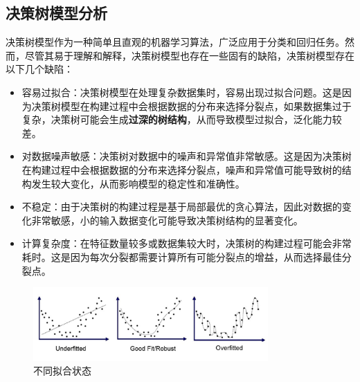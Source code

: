 \subsection{决策树模型分析}
决策树模型作为一种简单且直观的机器学习算法，广泛应用于分类和回归任务。然而，尽管其易于理解和解释，决策树模型也存在一些固有的缺陷，决策树模型存在以下几个缺陷：
\begin{itemize}
	\item 容易过拟合：决策树模型在处理复杂数据集时，容易出现过拟合问题。这是因为决策树模型在构建过程中会根据数据的分布来选择分裂点，如果数据集过于复杂，决策树可能会生成\textbf{过深的树结构}，从而导致模型过拟合，泛化能力较差。

	\item 对数据噪声敏感：决策树对数据中的噪声和异常值非常敏感。这是因为决策树在构建过程中会根据数据的分布来选择分裂点，噪声和异常值可能导致树的结构发生较大变化，从而影响模型的稳定性和准确性。
	\item 不稳定：由于决策树的构建过程是基于局部最优的贪心算法，因此对数据的变化非常敏感，小的输入数据变化可能导致决策树结构的显著变化。
	\item 计算复杂度：在特征数量较多或数据集较大时，决策树的构建过程可能会非常耗时。这是因为每次分裂都需要计算所有可能分裂点的增益，从而选择最佳分裂点。
\end{itemize}
\begin{figure}[H]
	\centering
	\includegraphics[width=0.8\textwidth]{figures/fit_status.png}
	\caption{不同拟合状态}
	\label{fig:fit_status}
\end{figure}

